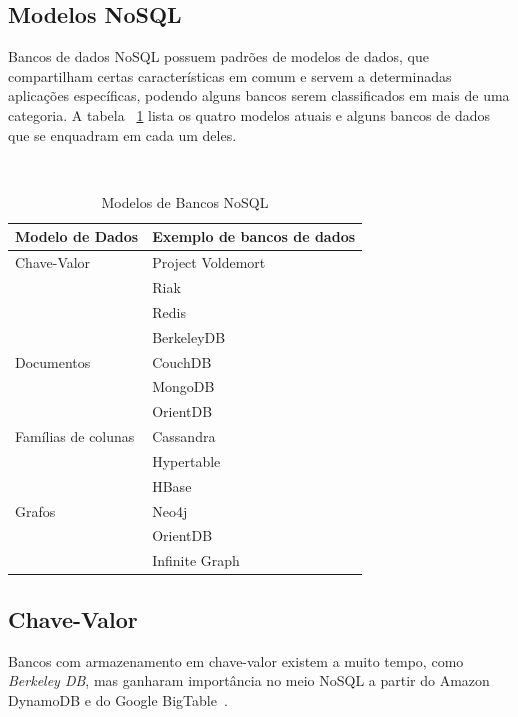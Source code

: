 \subsection{Modelos NoSQL}
Bancos de dados NoSQL possuem padrões de modelos de dados, que compartilham certas características em comum e servem a determinadas aplicações específicas, podendo alguns bancos serem classificados em mais de uma categoria. A tabela ~\ref{tab:modelosnosql} lista os quatro modelos atuais e alguns bancos de dados que se enquadram em cada um deles.

~\begin{table}[]
\centering
\caption{Modelos de Bancos NoSQL}
\label{tab:modelosnosql}
\begin{tabular}{ll}
\textbf{Modelo de Dados}     & \textbf{Exemplo de bancos de dados}      \\ \hline
Chave-Valor         & Project Voldemort               \\
                    & Riak                            \\
                    & Redis                           \\
                    & BerkeleyDB                      \\ \hline
Documentos          & CouchDB                         \\
                    & MongoDB                         \\
                    & OrientDB                        \\ \hline
Famílias de colunas & Cassandra                       \\
					& Hypertable                      \\
                    & HBase                           \\ \hline
Grafos              & Neo4j \\
                    & OrientDB                        \\
                    & Infinite Graph                 
\end{tabular}
\end{table}

\subsection*{Chave-Valor}
Bancos com armazenamento em chave-valor existem a muito tempo, como \emph{Berkeley DB}, mas ganharam importância no meio NoSQL a partir do Amazon DynamoDB e do Google BigTable~\cite{chrisnosql}.


